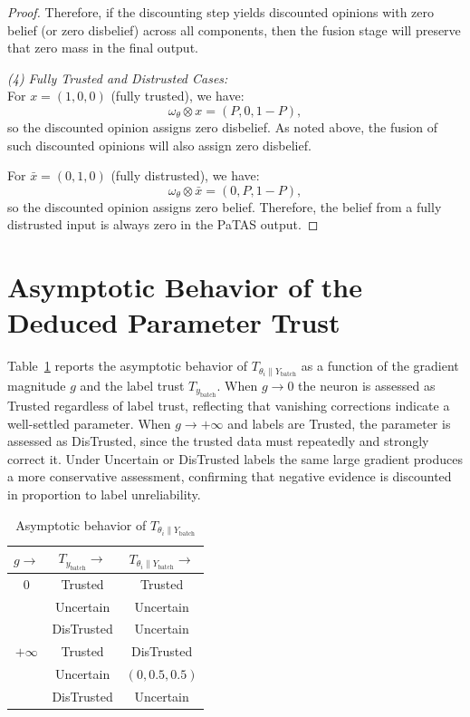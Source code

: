 \begin{proof}
Therefore, if the discounting step yields discounted opinions with zero belief (or zero disbelief) across all components, then the fusion stage will preserve that zero mass in the final output.

\emph{(4) Fully Trusted and Distrusted Cases:} \\
For $x = (1, 0, 0)$ (fully trusted), we have:
\[
\omega_\theta \otimes x = (P, 0, 1 - P),
\]
so the discounted opinion assigns zero disbelief. As noted above, the fusion of such discounted opinions will also assign zero disbelief.

For $\bar{x} = (0, 1, 0)$ (fully distrusted), we have:
\[
\omega_\theta \otimes \bar{x} = (0, P, 1 - P),
\]
so the discounted opinion assigns zero belief. Therefore, the belief from a fully distrusted input is always zero in the PaTAS output.
\end{proof}


\section{Asymptotic Behavior of the Deduced Parameter Trust}
\label{app:asymptotic}

Table~\ref{tab:asymptotic} reports the asymptotic behavior 
of $T_{\theta_i \| Y_\text{batch}}$ as a function of the 
gradient magnitude $g$ and the label trust $T_{y_\text{batch}}$. 
When $g \to 0$ the neuron is assessed as Trusted regardless 
of label trust, reflecting that vanishing corrections indicate 
a well-settled parameter. When $g \to +\infty$ and labels are 
Trusted, the parameter is assessed as DisTrusted, since the 
trusted data must repeatedly and strongly correct it. Under 
Uncertain or DisTrusted labels the same large gradient produces 
a more conservative assessment, confirming that negative 
evidence is discounted in proportion to label unreliability.

\begin{table}[h]
\centering
\caption{Asymptotic behavior of $T_{\theta_i \| Y_\text{batch}}$}
\label{tab:asymptotic}
\begin{tabular}{ccc}
\toprule
$g \to$ & $T_{y_\text{batch}} \to$ & 
    $T_{\theta_i \| Y_\text{batch}} \to$ \\
\midrule
$0$ & Trusted      & Trusted      \\
    & Uncertain    & Uncertain    \\
    & DisTrusted   & Uncertain    \\
\midrule
$+\infty$ & Trusted    & DisTrusted       \\
          & Uncertain  & $(0, 0.5, 0.5)$  \\
          & DisTrusted & Uncertain        \\
\bottomrule
\end{tabular}
\end{table}





